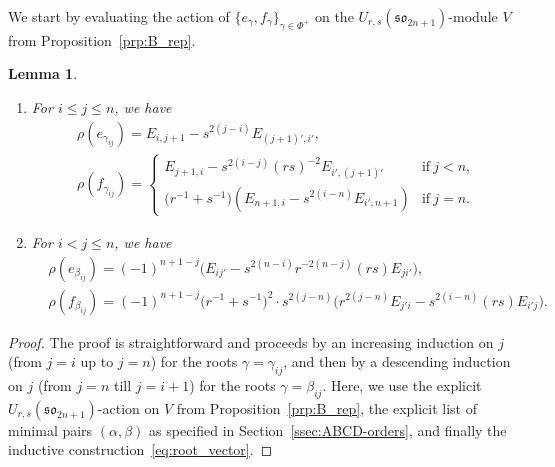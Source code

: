 \documentclass[10pt,a4paper]{amsart}
\numberwithin{equation}{section}
\newtheorem{Lemma}[Theorem]{Lemma}
\newcommand{\sso}{\mathfrak{so}}
\begin{document}
We start by evaluating the action of $\{e_\gamma,f_\gamma\}_{\gamma\in \Phi^+}$ on the $U_{r,s}(\sso_{2n+1})$-module $V$ from Proposition~\ref{prp:B_rep}.

\begin{Lemma}\label{lem:B-root-action}\quad\samepage
\begin{enumerate}\itemsep=0pt
\item[$(a)$] For $i\leq j\leq n$, we have
\begin{displaymath}
\begin{split}
 & \rho(e_{\gamma_{ij}}) = E_{i,j+1} - s^{2(j - i)}E_{(j + 1)',i'}, \\
 & \rho(f_{\gamma_{ij}}) =
 \begin{cases}
 E_{j + 1,i} - s^{2(i - j)}(rs)^{-2}E_{i',(j + 1)'} & \text{if}\ j < n ,\\
 \bigl(r^{-1} + s^{-1}\bigr)(E_{n + 1,i} - s^{2(i - n)}E_{i',n+1})& \text{if}\ j = n.
 \end{cases}
\end{split}
\end{displaymath}

\item[$(b)$] For $i<j\leq n$, we have
\begin{displaymath}
\begin{split}
 & \rho(e_{\beta_{ij}}) = (-1)^{n+ 1-j}\bigl(E_{ij'} - s^{2(n - i)}r^{-2(n - j)}(rs)E_{ji'}\bigr), \\
 & \rho(f_{\beta_{ij}}) = (-1)^{n+1-j}\bigl(r^{-1} + s^{-1}\bigr)^2\cdot s^{2(j-n)}
 \bigl(r^{2(j - n)}E_{j'i} - s^{2(i - n)}(rs)E_{i'j}\bigr).
\end{split}
\end{displaymath}
\end{enumerate}
\end{Lemma}

\begin{proof}
The proof is straightforward and proceeds by an increasing induction on $j$ (from $j=i$ up to $j=n$) for the roots $\gamma=\gamma_{ij}$, and then by a descending induction on $j$ (from $j=n$ till $j=i+1$) for the roots $\gamma=\beta_{ij}$. Here, we use the explicit $U_{r,s}(\sso_{2n+1})$-action on $V$ from Proposition~\ref{prp:B_rep}, the explicit list of minimal pairs $(\alpha,\beta)$ as specified in Section~\ref{ssec:ABCD-orders}, and finally the inductive construction~\eqref{eq:root_vector}.
\end{proof}
\end{document}
